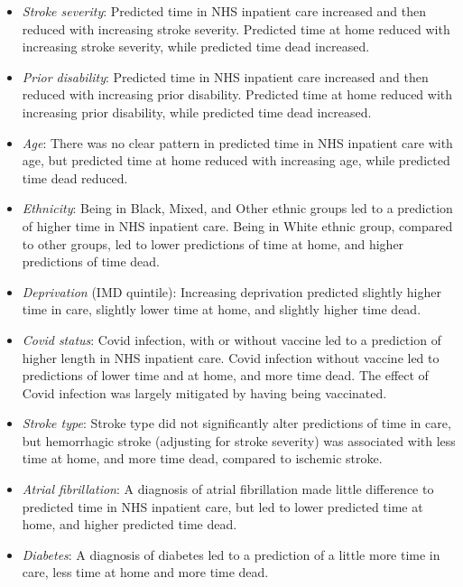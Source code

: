 \begin{itemize}
    \item \textit{Stroke severity}: Predicted time in NHS inpatient care increased and then reduced with increasing stroke severity. Predicted time at home reduced with increasing stroke severity, while predicted time dead increased.

    \item \textit{Prior disability}: Predicted time in NHS inpatient care increased and then reduced with increasing prior disability. Predicted time at home reduced with increasing prior disability, while predicted time dead increased.

    \item \textit{Age}: There was no clear pattern in predicted time in NHS inpatient care with age, but predicted time at home reduced with increasing age, while predicted time dead reduced.

    \item \textit{Ethnicity}: Being in Black, Mixed, and Other ethnic groups led to a prediction of higher time in NHS inpatient care. Being in White ethnic group, compared to other groups, led to lower predictions of time at home, and higher predictions of time dead.

    \item \textit{Deprivation} (IMD quintile): Increasing deprivation predicted slightly higher time in care, slightly lower time at home, and slightly higher time dead.

     \item \textit{Covid status}: Covid infection, with or without vaccine led to a prediction of higher length in NHS inpatient care. Covid infection without vaccine led to predictions of lower time and at home, and more time dead. The effect of Covid infection was largely mitigated by having being vaccinated.

     \item \textit{Stroke type}: Stroke type did not significantly alter predictions of time in care, but hemorrhagic stroke (adjusting for stroke severity) was associated with less time at home, and more time dead, compared to ischemic stroke.

     \item \textit{Atrial fibrillation}: A diagnosis of atrial fibrillation made little difference to predicted time in NHS inpatient care, but led to lower predicted time at home, and higher predicted time dead.

     \item \textit{Diabetes}: A diagnosis of diabetes led to a prediction of a little more time in care, less time at home and more time dead. 
     
\end{itemize}

